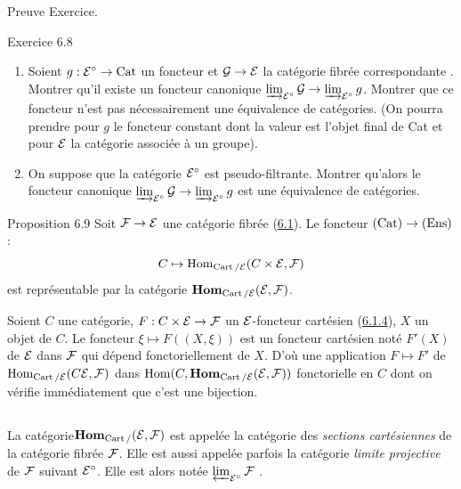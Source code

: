 \documentclass[10pt]{../fichiers-configuration-latex/smfart}
\begin{document}
\begin{enonce*}[remark]{Preuve}
Exercice.
\end{enonce*}

\begin{enonce*}[remark]{Exercice 6.8}
\begin{enumerate}
\renewcommand{\labelenumi}{\theenumi)}
\item Soient $g : {\Ee}^{\circ} \to \Cat$ un foncteur et
  $\Gg \to \Ee$ la catégorie fibrée correspondante
  \cite{SGA4-06:5}. Montrer qu'il existe un foncteur canonique
  $\varinjlim_{\Ee^{\circ}} \Gg \to
  \varinjlim_{\Ee^{\circ}} g$. Montrer que ce foncteur
  n'est pas nécessairement une équivalence de catégories. (On pourra
  prendre pour $g$ le foncteur constant dont la valeur est l'objet
  final de Cat et pour ${\mathcal E}$ la catégorie associée à un groupe).

\item On suppose que la catégorie ${\mathcal E}^{\circ}$ est
  pseudo-filtrante. Montrer qu'alors le foncteur canonique
  $\varinjlim_{\Ee^{\circ}} \Gg \to
  \varinjlim_{\Ee^{\circ}} g$ est une équivalence de
  catégories.
\end{enumerate}
\end{enonce*}

\begin{enonce*}{Proposition 6.9}
Soit $\Ff \to \Ee$ une catégorie fibrée (\hyperref[VI.def6.1]{6.1}). Le
foncteur $(\Cat) \to (\Ens)$:
$$
C \mapsto \operatorname{Hom}_{\operatorname{Cart}/{\mathcal E}} (C \times {\mathcal E}, {\mathcal F})
$$
est représentable par la catégorie $\operatorname{\mathbf{Hom}}_{\operatorname{Cart}/{\mathcal E}}
({\mathcal E}, {\mathcal F})$.
\end{enonce*}

Soient $C$ une catégorie, $F : C \times \Ee \to \Ff$
un ${\mathcal E}$-foncteur cartésien (\hyperref[VI.subsubsec6.1.4]{6.1.4}), $X$ un objet de $C$. Le
foncteur $\xi \mapsto F((X, \xi))$ est un foncteur cartésien noté
$F'(X)$ de ${\mathcal E}$ dans ${\mathcal F}$ qui dépend
fonctoriellement de $X$. D'où une application $F \mapsto F'$ de
$\operatorname{Hom}_{\operatorname{Cart}/{\mathcal E}} (C {\mathcal E}, {\mathcal F})$ dans $\operatorname{Hom}(C,
\operatorname{\mathbf{Hom}}_{\operatorname{Cart}/{\mathcal E}} ({\mathcal E}, {\mathcal F}))$ fonctorielle en
$C$ dont on vérifie immédiatement que c'est une bijection.

\setcounter{subsection}{9}
\subsection{}

La catégorie\pageoriginale $\operatorname{\mathbf{Hom}}_{\operatorname{Cart}/} ({\mathcal E}, {\mathcal F})$
est appelée la catégorie des \emph{sections cartésiennes} de la catégorie fibrée
${\mathcal F}$. Elle est aussi appelée parfois la catégorie
\emph{limite projective} de ${\mathcal F}$ suivant
${\mathcal E}^{\circ}$. Elle est alors notée
$\varprojlim_{{\mathcal E}^{\circ}} {\mathcal F}$ \cite{SGA4-06:2}.
\end{document}
